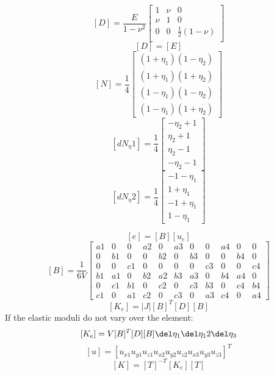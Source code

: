     \[  [D] = \frac{E}{1-\nu^2} \left[ \begin{array}{ccc}
               1   & \nu & 0  \\
               \nu & 1   & 0 \\
               0   & 0   & \frac{1}{2} (1-\nu)  \\
            \end{array}\right] \]
    \[ [D] = [E] \]
    \[ [N] = \frac{1}{4} \left[ \begin{array}{c}
               (1+\eta_1)(1-\eta_2) \\
               (1+\eta_1)(1+\eta_2) \\
               (1-\eta_1)(1-\eta_2) \\
               (1-\eta_1)(1+\eta_2)
            \end{array}\right]\]
    \[ [dN_\eta1] = \frac{1}{4} \left[ \begin{array}{c}
               -\eta_2 + 1 \\
                \eta_2 + 1 \\
                \eta_2 - 1 \\
               -\eta_2 - 1
            \end{array}\right]\]
    \[ [dN_\eta2] = \frac{1}{4} \left[ \begin{array}{c}
              -1 - \eta_1 \\
               1 + \eta_1 \\
              -1 + \eta_1 \\
               1 - \eta_1
            \end{array}\right]\]
    
    \[ [e] = [B] [u_e] \]
    \[ [B] = \frac{1}{6V}\left[ \begin{array}{cccccccccccc}
               a1 & 0  & 0  & a2 & 0  & a3 & 0  & 0  & a4 & 0  & 0  \\
               0  & b1 & 0  & 0  & b2 & 0  & b3 & 0  & 0  & b4 & 0  \\
               0  & 0  & c1 & 0  & 0  & 0  & 0  & c3 & 0  & 0  & c4 \\
               b1 & a1 & 0  & b2 & a2 & b3 & a3 & 0  & b4 & a4 & 0  \\
               0  & c1 & b1 & 0  & c2 & 0  & c3 & b3 & 0  & c4 & b4 \\
               c1 & 0  & a1 & c2 & 0  & c3 & 0  & a3 & c4 & 0  & a4 
            \end{array}\right]\]
     \[  [K_e] = |J| [B]^T [D] [B] \]
     If the elastic moduli do not vary over the element:
     \[  [K_e] = V [B]^T [D] [B] \del \eta_1 \del \eta_12\del \eta_3 \]
     \[ [u] = [u_{x1} u_{y1} u_{z1}
               u_{x2} u_{y2} u_{z2}
               u_{x3} u_{y3} u_{z3} ]^T \]
      \[ [K] = [T]^{-T} [K_e] [T]  \]
      
